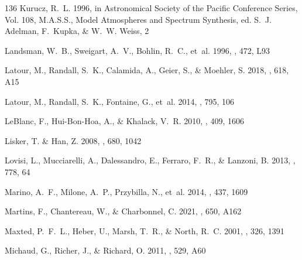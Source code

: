 \documentclass{aa}
\begin{document}
\begin{thebibliography}{136}
{Kurucz}, R.~L. 1996, in Astronomical Society of the Pacific Conference Series,
  Vol. 108, M.A.S.S., Model Atmospheres and Spectrum Synthesis, ed. S.~J.
  {Adelman}, F.~{Kupka}, \& W.~W. {Weiss}, 2

{Landsman}, W.~B., {Sweigart}, A.~V., {Bohlin}, R.~C., {et~al.} 1996, \apjl,
  472, L93

{Latour}, M., {Randall}, S.~K., {Calamida}, A., {Geier}, S., \& {Moehler}, S.
  2018, \aap, 618, A15

{Latour}, M., {Randall}, S.~K., {Fontaine}, G., {et~al.} 2014, \apj, 795, 106

{LeBlanc}, F., {Hui-Bon-Hoa}, A., \& {Khalack}, V.~R. 2010, \mnras, 409, 1606

{Lisker}, T. \& {Han}, Z. 2008, \apj, 680, 1042

{Lovisi}, L., {Mucciarelli}, A., {Dalessandro}, E., {Ferraro}, F.~R., \&
  {Lanzoni}, B. 2013, \apj, 778, 64

{Marino}, A.~F., {Milone}, A.~P., {Przybilla}, N., {et~al.} 2014, \mnras, 437,
  1609

{Martins}, F., {Chantereau}, W., \& {Charbonnel}, C. 2021, \aap, 650, A162

{Maxted}, P.~F.~L., {Heber}, U., {Marsh}, T.~R., \& {North}, R.~C. 2001,
  \mnras, 326, 1391

{Michaud}, G., {Richer}, J., \& {Richard}, O. 2011, \aap, 529, A60


\end{thebibliography}
\end{document}
